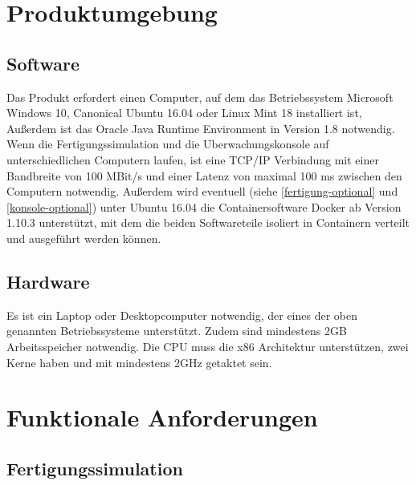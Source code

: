 \documentclass[parskip=full]{scrartcl}
\begin{document}
\pagebreak
\section{Produktumgebung}
\subsection{Software}
Das Produkt erfordert einen Computer, auf dem das Betriebssystem Microsoft Windows 10, Canonical Ubuntu 16.04 oder Linux Mint 18 installiert ist,
Außerdem ist das Oracle Java Runtime Environment in Version 1.8
notwendig. Wenn die \gls{Fertigungssimulation} und die \gls{Uberwachungskonsole} auf unterschiedlichen Computern laufen,
ist eine \gls{TCP/IP} Verbindung mit einer Bandbreite von 100 MBit/s und einer Latenz von maximal 100 ms zwischen den Computern notwendig.
Außerdem wird eventuell (siehe \ref{fertigung-optional} und \ref{konsole-optional}) unter Ubuntu 16.04 die Containersoftware Docker
ab Version 1.10.3 unterstützt, mit dem die beiden Softwareteile isoliert in Containern verteilt und ausgeführt werden können.

\subsection{Hardware}
\label{Hardware}
Es ist ein Laptop oder Desktopcomputer notwendig, der eines der oben genannten Betriebssysteme unterstützt.
Zudem sind mindestens 2GB Arbeitsspeicher notwendig. Die CPU muss die x86 Architektur unterstützen, zwei Kerne haben und mit
mindestens 2GHz getaktet sein.

\pagebreak
\section{Funktionale Anforderungen}
\subsection{Fertigungssimulation}
\end{document}
